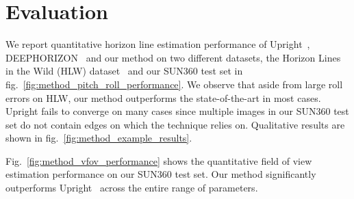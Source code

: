 
\section{Evaluation}

We report quantitative horizon line estimation performance of Upright~\cite{Lee2014}, DEEPHORIZON~\cite{Workman2016} and our method on two different datasets, the Horizon Lines in the Wild (HLW) dataset~\cite{Workman2016} and our SUN360 test set in fig.~\ref{fig:method_pitch_roll_performance}. We observe that aside from large roll errors on HLW, our method outperforms the state-of-the-art in most cases. Upright fails to converge on many cases since multiple images in our SUN360 test set do not contain edges on which the technique relies on. Qualitative results are shown in fig.~\ref{fig:method_example_results}.

Fig.~\ref{fig:method_vfov_performance} shows the quantitative field of view estimation performance on our SUN360 test set.
Our method significantly outperforms Upright~\cite{Lee2014} across the entire range of parameters.



